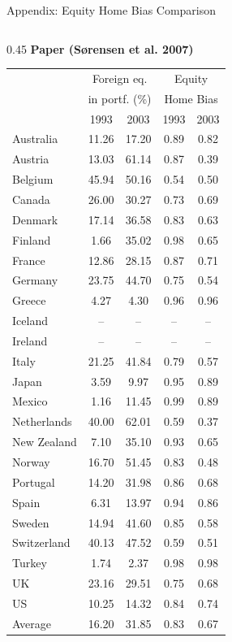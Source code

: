 \documentclass[aspectratio=169, 10pt]{beamer}
\begin{document}
\begin{frame}{Appendix: Equity Home Bias Comparison}
\centering
\tiny
\begin{columns}[T]
\begin{column}{0.45\textwidth}
\centering
\textbf{Paper (Sørensen et al. 2007)}\\[2.6em]
\begin{tabular}{lcccc}
\hline
 & \multicolumn{2}{c}{Foreign eq.} & \multicolumn{2}{c}{Equity} \\
 & \multicolumn{2}{c}{in portf. (\%)} & \multicolumn{2}{c}{Home Bias} \\
 & 1993 & 2003 & 1993 & 2003 \\
\hline
Australia    & 11.26 & 17.20 & 0.89 & 0.82 \\
Austria      & 13.03 & 61.14 & 0.87 & 0.39 \\
Belgium      & 45.94 & 50.16 & 0.54 & 0.50 \\
Canada       & 26.00 & 30.27 & 0.73 & 0.69 \\
Denmark      & 17.14 & 36.58 & 0.83 & 0.63 \\
Finland      &  1.66 & 35.02 & 0.98 & 0.65 \\
France       & 12.86 & 28.15 & 0.87 & 0.71 \\
Germany      & 23.75 & 44.70 & 0.75 & 0.54 \\
Greece       &  4.27 &  4.30 & 0.96 & 0.96 \\
Iceland      &  --   &  --   &  --  &  --  \\
Ireland      &  --   &  --   &  --  &  --  \\
Italy        & 21.25 & 41.84 & 0.79 & 0.57 \\
Japan        &  3.59 &  9.97 & 0.95 & 0.89 \\
Mexico       &  1.16 & 11.45 & 0.99 & 0.89 \\
Netherlands  & 40.00 & 62.01 & 0.59 & 0.37 \\
New Zealand  &  7.10 & 35.10 & 0.93 & 0.65 \\
Norway       & 16.70 & 51.45 & 0.83 & 0.48 \\
Portugal     & 14.20 & 31.98 & 0.86 & 0.68 \\
Spain        &  6.31 & 13.97 & 0.94 & 0.86 \\
Sweden       & 14.94 & 41.60 & 0.85 & 0.58 \\
Switzerland  & 40.13 & 47.52 & 0.59 & 0.51 \\
Turkey       &  1.74 &  2.37 & 0.98 & 0.98 \\
UK           & 23.16 & 29.51 & 0.75 & 0.68 \\
US           & 10.25 & 14.32 & 0.84 & 0.74 \\
\hline
Average      & 16.20 & 31.85 & 0.83 & 0.67 \\
\hline
\end{tabular}
\end{column}


\end{columns}
\end{frame}
\end{document}
